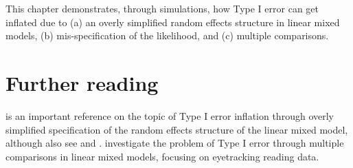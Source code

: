 \documentclass[
  12pt,
]{krantz}
\theoremstyle{definition}
\theoremstyle{definition}
\theoremstyle{definition}
\theoremstyle{definition}
\theoremstyle{remark}
\begin{document}
This chapter demonstrates, through simulations, how Type I error can get inflated due to (a) an overly simplified random effects structure in linear mixed models, (b) mis-specification of the likelihood, and (c) multiple comparisons.

\hypertarget{further-reading-5}{%
\section{Further reading}\label{further-reading-5}}

\citet{barr2013} is an important reference on the topic of Type I error inflation through overly simplified specification of the random effects structure of the linear mixed model, although also see \citet{hannesBEAP} and \citet{BatesEtAlParsimonious}. \citet{MalsburgAngele2016} investigate the problem of Type I error through multiple comparisons in linear mixed models, focusing on eyetracking reading data.

  

\backmatter
\printindex
\end{document}
